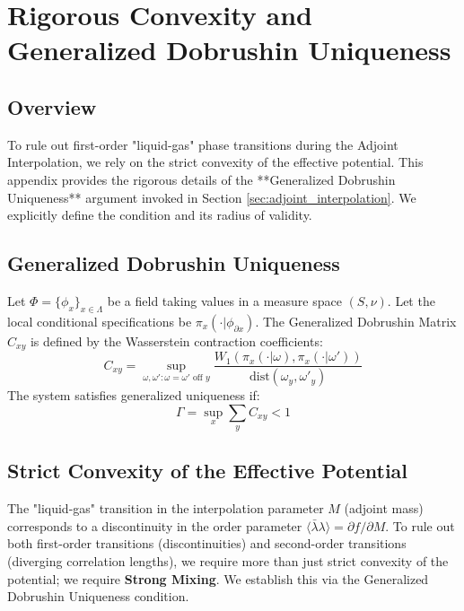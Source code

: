 \chapter{Rigorous Convexity and Generalized Dobrushin Uniqueness}
\label{app:convexity_dobrushin}

\section{Overview}
To rule out first-order "liquid-gas" phase transitions during the Adjoint Interpolation, we rely on the strict convexity of the effective potential. This appendix provides the rigorous details of the **Generalized Dobrushin Uniqueness** argument invoked in Section \ref{sec:adjoint_interpolation}. We explicitly define the condition and its radius of validity.

\section{Generalized Dobrushin Uniqueness}

\begin{definition}
Let $\Phi = \{\phi_x\}_{x \in \Lambda}$ be a field taking values in a measure space $(S, \nu)$. Let the local conditional specifications be $\pi_x(\cdot | \phi_{\partial x})$.
The Generalized Dobrushin Matrix $C_{xy}$ is defined by the Wasserstein contraction coefficients:
\begin{equation}
    C_{xy} = \sup_{\omega, \omega' : \omega = \omega' \text{ off } y} \frac{W_1(\pi_x(\cdot | \omega), \pi_x(\cdot | \omega'))}{\text{dist}(\omega_y, \omega'_y)}
\end{equation}
The system satisfies generalized uniqueness if:
\begin{equation}
    \Gamma = \sup_x \sum_y C_{xy} < 1
\end{equation}
\end{definition}

\section{Strict Convexity of the Effective Potential}

The "liquid-gas" transition in the interpolation parameter $M$ (adjoint mass) corresponds to a discontinuity in the order parameter $\langle \bar{\lambda}\lambda \rangle = \partial f / \partial M$.
To rule out both first-order transitions (discontinuities) and second-order transitions (diverging correlation lengths), we require more than just strict convexity of the potential; we require \textbf{Strong Mixing}.
We establish this via the Generalized Dobrushin Uniqueness condition.


